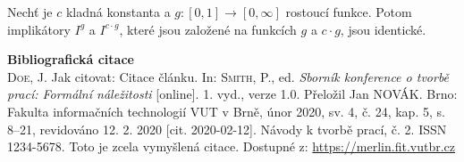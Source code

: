 \begin{sentence}
\cite{hlinena}
    Nech\v t je $c$ kladn\'a konstanta a $g:[0,1] \to [0,\infty]$
    rostoucí  funkce. Potom implik\'atory $I^g$ a $I^{c \cdot g}$,
    které jsou zalo\v zen\'e na  funkcích $g$ a $c \cdot g$, jsou
    identick\'e.
\end{sentence}
\noindent \textbf{Bibliografická citace}\\
\textsc{Doe}, J. Jak citovat: Citace článku.
In: \textsc{Smith}, P., ed. \textit{Sborník konference o tvorbě prací: Formální náležitosti} [online]. 1. vyd., verze 1.0. Přeložil Jan NOVÁK. Brno: Fakulta informačních technologií VUT v Brně, únor 2020, sv. 4, č. 24, kap. 5, s. 8–21, revidováno 12. 2. 2020 [cit. 2020-02-12]. Návody k tvorbě prací, č. 2. ISSN 1234-5678. Toto je zcela vymyšlená citace. Dostupné z: \url{https://merlin.fit.vutbr.cz}
